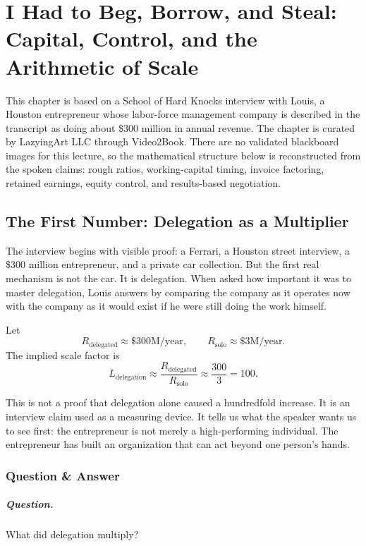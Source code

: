 \chapter{I Had to Beg, Borrow, and Steal: Capital, Control, and the Arithmetic of Scale}

This chapter is based on a School of Hard Knocks interview with Louis, a Houston entrepreneur whose labor-force management company is described in the transcript as doing about \$300 million in annual revenue. The chapter is curated by LazyingArt LLC through Video2Book. There are no validated blackboard images for this lecture, so the mathematical structure below is reconstructed from the spoken claims: rough ratios, working-capital timing, invoice factoring, retained earnings, equity control, and results-based negotiation.

\section{The First Number: Delegation as a Multiplier}

The interview begins with visible proof: a Ferrari, a Houston street interview, a \$300 million entrepreneur, and a private car collection. But the first real mechanism is not the car. It is delegation. When asked how important it was to master delegation, Louis answers by comparing the company as it operates now with the company as it would exist if he were still doing the work himself.

Let
\[
R_{\mathrm{delegated}} \approx \$300\text{M/year},
\qquad
R_{\mathrm{solo}} \approx \$3\text{M/year}.
\]
The implied scale factor is
\begin{equation}
L_{\mathrm{delegation}}
   \approx
   \frac{R_{\mathrm{delegated}}}{R_{\mathrm{solo}}}
   \approx
   \frac{300}{3}
   =
   100.
\end{equation}

This is not a proof that delegation alone caused a hundredfold increase. It is an interview claim used as a measuring device. It tells us what the speaker wants us to see first: the entrepreneur is not merely a high-performing individual. The entrepreneur has built an organization that can act beyond one person's hands.

\subsection{Question \& Answer}

\paragraph{Question.} What did delegation multiply?

